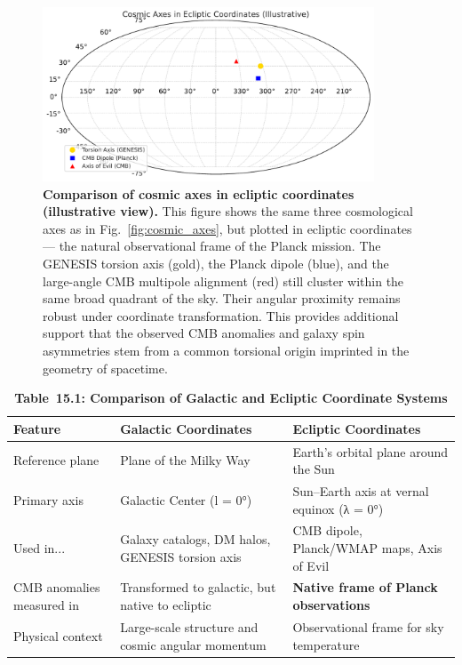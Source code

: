 \documentclass{article}
\begin{document}
\begin{figure}[h!]
    \centering
    \includegraphics[width=0.88\textwidth]{Fig_AA2_ecliptic_axes.pdf}
    \caption{
    \textbf{Comparison of cosmic axes in ecliptic coordinates (illustrative view).}
    This figure shows the same three cosmological axes as in Fig.~\ref{fig:cosmic_axes}, but plotted in ecliptic coordinates --- the natural observational frame of the Planck mission.
    The GENESIS torsion axis (gold), the Planck dipole (blue), and the large-angle CMB multipole alignment (red) still cluster within the same broad quadrant of the sky.
    Their angular proximity remains robust under coordinate transformation.
    This provides additional support that the observed CMB anomalies and galaxy spin asymmetries stem from a common torsional origin imprinted in the geometry of spacetime.
    }
    \label{fig:ecliptic_axes}
\end{figure}

\begin{table}[h!]
\centering
\caption*{\textbf{Table~15.1: Comparison of Galactic and Ecliptic Coordinate Systems}}
\begin{tabular}{|p{4cm}|p{5.5cm}|p{5.5cm}|}
\hline
\textbf{Feature} & \textbf{Galactic Coordinates} & \textbf{Ecliptic Coordinates} \\
\hline
Reference plane & Plane of the Milky Way & Earth's orbital plane around the Sun \\
\hline
Primary axis & Galactic Center (l = 0°) & Sun–Earth axis at vernal equinox (λ = 0°) \\
\hline
Used in... & Galaxy catalogs, DM halos, GENESIS torsion axis & CMB dipole, Planck/WMAP maps, Axis of Evil \\
\hline
CMB anomalies measured in & Transformed to galactic, but native to ecliptic & \textbf{Native frame of Planck observations} \\
\hline
Physical context & Large-scale structure and cosmic angular momentum & Observational frame for sky temperature \\
\hline
\end{tabular}
\end{table}
\end{document}
